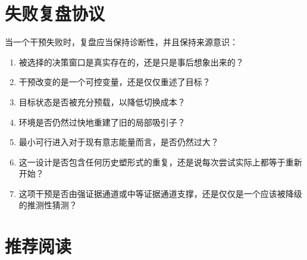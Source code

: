\section{失败复盘协议}

当一个干预失败时，复盘应当保持诊断性，并且保持来源意识：
\begin{enumerate}[nosep]
  \item 被选择的决策窗口是真实存在的，还是只是事后想象出来的？
  \item 干预改变的是一个可控变量，还是仅仅重述了目标？
  \item 目标状态是否被充分预载，以降低切换成本？
  \item 环境是否仍然过快地重建了旧的局部吸引子？
  \item 最小可行进入对于现有意志能量而言，是否仍然过大？
  \item 这一设计是否包含任何历史塑形式的重复，还是说每次尝试实际上都等于重新开始？
  \item 这项干预是否由强证据通道或中等证据通道支撑，还是仅仅是一个应该被降级的推测性猜测？
\end{enumerate}

\section{推荐阅读}

